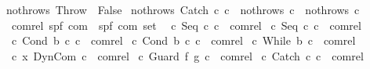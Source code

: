 \begin{isabellebody}
{\isachardoublequoteopen}nothrows\ Throw\ {\isacharequal}\ False{\isachardoublequoteclose}\ {\isacharbar}\isanewline
{\isachardoublequoteopen}nothrows\ {\isacharparenleft}Catch\ c\ c\ {\isacharequal}\ {\isacharparenleft}nothrows\ c\ {\isasymand}\ nothrows\ c%
\isamarkuptrue%
\isamarkupfalse%
\ com{\isacharunderscore}rel\ {\isacharcolon}{\isacharcolon}{\isachardoublequoteopen}{\isacharparenleft}{\isacharparenleft}{\isacharprime}s{\isacharcomma}{\isacharprime}p{\isacharcomma}{\isacharprime}f{\isacharparenright}\ com\ {\isasymtimes}\ {\isacharparenleft}{\isacharprime}s{\isacharcomma}{\isacharprime}p{\isacharcomma}{\isacharprime}f{\isacharparenright}\ com{\isacharparenright}\ set{\isachardoublequoteclose}\isanewline
{}\isanewline
\ \ {\isachardoublequoteopen}{\isacharparenleft}c{}{\isacharcomma}\ Seq\ c{}\ c{}{\isacharparenright}\ {\isasymin}\ com{\isacharunderscore}rel{\isachardoublequoteclose}\isanewline
{\isacharbar}\ {\isachardoublequoteopen}{\isacharparenleft}c{}{\isacharcomma}\ Seq\ c{}\ c{}{\isacharparenright}\ {\isasymin}\ com{\isacharunderscore}rel{\isachardoublequoteclose}\isanewline
{\isacharbar}\ {\isachardoublequoteopen}{\isacharparenleft}c{}{\isacharcomma}\ Cond\ b\ c{}\ c{}{\isacharparenright}\ {\isasymin}\ com{\isacharunderscore}rel{\isachardoublequoteclose}\isanewline
{\isacharbar}\ {\isachardoublequoteopen}{\isacharparenleft}c{}{\isacharcomma}\ Cond\ b\ c{}\ c{}{\isacharparenright}\ {\isasymin}\ com{\isacharunderscore}rel{\isachardoublequoteclose}\isanewline
{\isacharbar}\ {\isachardoublequoteopen}{\isacharparenleft}c{\isacharcomma}\ While\ b\ c{\isacharparenright}\ {\isasymin}\ com{\isacharunderscore}rel{\isachardoublequoteclose}\isanewline
{\isacharbar}\ {\isachardoublequoteopen}{\isacharparenleft}c\ x{\isacharcomma}\ DynCom\ c{\isacharparenright}\ {\isasymin}\ com{\isacharunderscore}rel{\isachardoublequoteclose}\isanewline
{\isacharbar}\ {\isachardoublequoteopen}{\isacharparenleft}c{\isacharcomma}\ Guard\ f\ g\ c{\isacharparenright}\ {\isasymin}\ com{\isacharunderscore}rel{\isachardoublequoteclose}\isanewline
{\isacharbar}\ {\isachardoublequoteopen}{\isacharparenleft}c{}{\isacharcomma}\ Catch\ c{}\ c{}{\isacharparenright}\ {\isasymin}\ com{\isacharunderscore}rel{\isachardoublequoteclose}\isanewline

\end{isabellebody}

